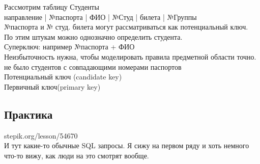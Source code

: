 \noindent Рассмотрим таблицу Студенты \\
\noindent направление | №паспорта | ФИО | №Студ | билета | №Группы \\

\noindent №паспорта и № студ. билета могут рассматриваться как потенциальный ключ. \\
\noindent По этим штукам можно однозначно определить студента. \\
\noindent Суперключ: например №паспорта + ФИО \\

\noindent Неизбыточность нужна, чтобы моделировать правила предметной области точно. не было студентов с совпадающими номерами паспортов \\

\noindent Потенциальный ключ (candidate key) \\
\noindent Первичный ключ(primary key) \\

\subsection*{Практика
}

\noindent stepik.org/lesson/54670 \\

\noindent И тут какие-то обычные SQL запросы. Я сижу на первом ряду и хоть немного что-то вижу, как люди на это смотрят вообще. \\
